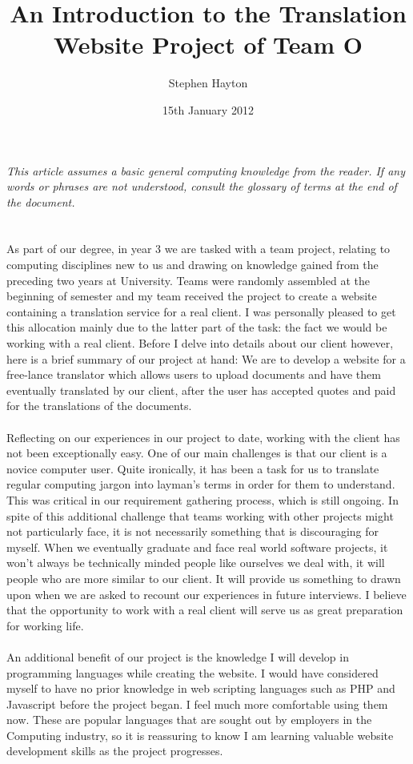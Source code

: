 \documentclass{article}
\title{An Introduction to the Translation Website Project of Team O}
\author{Stephen Hayton}
\date{15th January 2012}
\begin{document}
\maketitle

\textit{\small{This article assumes a basic general computing knowledge from the reader. If any words or phrases are not understood, consult the glossary of terms at the end of the document.}}\\
\\
\\
As part of our degree, in year 3 we are tasked with a team project, relating to computing disciplines new to us and drawing on knowledge gained from the preceding two years at University. Teams were randomly assembled at the beginning of semester and my team received the project to create a website containing a translation service for a real client. I was personally pleased to get this allocation mainly due to the latter part of the task: the fact we would be working with a real client. Before I delve into details about our client however, here is a brief summary of our project at hand: We are to develop a website for a free-lance translator which allows users to upload documents and have them eventually translated by our client, after the user has accepted quotes and paid for the translations of the documents.\\ 
\\
Reflecting on our experiences in our project to date, working with the client has not been exceptionally easy. One of our main challenges is that our client is a novice computer user. Quite ironically, it has been a task for us to translate regular computing jargon into layman's terms in order for them to understand. This was critical in our requirement gathering process, which is still ongoing. In spite of this additional challenge that teams working with other projects might not particularly face, it is not necessarily something that is discouraging for myself. When we eventually graduate and face real world software projects, it won't always be technically minded people like ourselves we deal with, it will people who are more similar to our client. It will provide us something to drawn upon when we are asked to recount our experiences in future interviews.  I believe that the opportunity to work with a real client will serve us as great preparation for working life.\\
\\
An additional benefit of our project is the knowledge I will develop in programming languages while creating the website. I would have considered myself to have no prior knowledge in web scripting languages such as PHP and Javascript before the project began. I feel much more comfortable using them now. These are popular languages that are sought out by employers in the Computing industry, so it is reassuring to know I am learning valuable website development skills as the project progresses.\\
\end{document}
